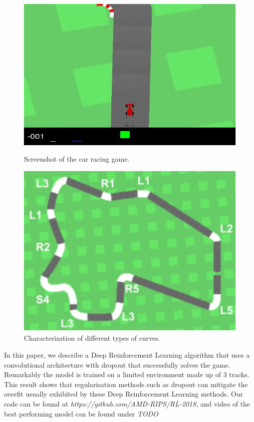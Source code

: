 \documentclass{article}
\begin{document}
\begin{figure}[!h]
\captionsetup{justification=centering}
\centering
\begin{minipage}{.4\textwidth}
  \centering
  \includegraphics[width=\linewidth]{Graphics/carracing.jpg}
  \caption{Screenshot of the car racing game. }
  \label{fig:carracing}
\end{minipage}
\hspace{1cm}
\begin{minipage}{.4\textwidth}
  \centering
  \includegraphics[width=\linewidth]{Graphics/curve_characterization.png}
  \caption{Characterization of different types of curves. }
  \label{fig:curves}
\end{minipage}
\end{figure}

In this paper, we describe a Deep Reinforcement Learning algorithm that uses a convolutional architecture with dropout that 
successfully solves the game. Remarkably the model is trained on a limited environment made up of 3 tracks. This result 
shows that regularisation methods such as dropout can mitigate the overfit usually exhibited by these Deep Reinforcement Learning methods. Our code can be found at \textit{https://github.com/AMD-RIPS/RL-2018}, and video of the best performing model can be found under \textit{TODO}
\end{document}
